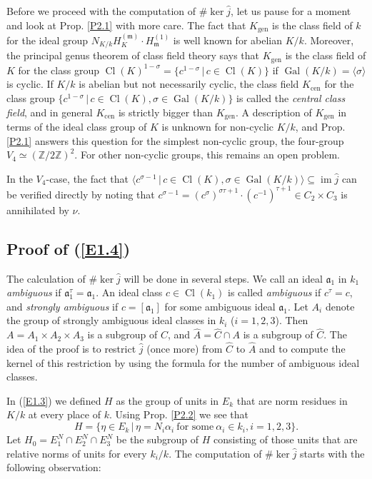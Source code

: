 \documentclass{amsart}
\newcommand{\Z}{\mathbb Z}
\newcommand{\fa}{{\mathfrak a}}
\newcommand{\fm}{{\mathfrak m}}
\newcommand{\hj}{\widehat{j}}
\newcommand{\hA}{\widehat{A}}
\newcommand{\hC}{\widehat{C}}
\newcommand{\la}{\langle}
\newcommand{\ra}{\rangle}
\newcommand{\sth}{\,|\,}
\newcommand{\Gal}{\operatorname{Gal}}
\newcommand{\Cl}{\operatorname{Cl}}
\newcommand{\im}{\operatorname{im}}
\newcommand{\gen}{{\operatorname{gen}}}
\newcommand{\cen}{{\operatorname{cen}}}
\begin{document}
Before we proceed with the computation of $\# \ker \hj$,
let us pause for a moment and look at Prop. \ref{P2.1} with
more care. The fact that $K_\gen$ is the class field of $k$
for the ideal group $N_{K/k} H_K^{(\fm)} \cdot H_{\fm}^{(1)}$
is well known for abelian $K/k$. Moreover, the principal
genus theorem of class field theory says that $K_\gen$ is
the class field of $K$ for the class group $\Cl(K)^{1-\sigma} =
\{c^{1-\sigma} \sth c \in \Cl(K)\}$ if $\Gal(K/k) = \la \sigma \ra$
is cyclic. If $K/k$ is abelian but not necessarily cyclic, the
class field $K_\cen$ for the class group $\{c^{1-\sigma} \sth
c \in \Cl(K), \sigma \in \Gal(K/k)\}$ is called the {\em central
class field}, and in general $K_\cen$ is strictly bigger than
$K_\gen$. A description of $K_\gen$ in terms of the ideal class
group of $K$ is unknown for non-cyclic $K/k$, and Prop. \ref{P2.1}
answers this question for the simplest non-cyclic group, the
four-group $V_4 \simeq (\Z/2\Z)^2$. For other non-cyclic groups,
this remains an open problem.

In the $V_4$-case, the fact that $\la c^{\sigma-1} \sth c \in \Cl(K),
\sigma \in \Gal(K/k) \ra \subseteq \im \hj$ can be verified
directly by noting that $c^{\sigma-1} = (c^\sigma)^{\sigma\tau+1}
\cdot (c^{-1})^{\tau+1} \in C_2 \times C_3$ is annihilated by $\nu$.

\subsection*{Proof of (\ref{E1.4})}

The calculation of $\# \ker \hj$ will be done in several steps.
We call an ideal $\fa_1$ in $k_1$ {\em ambiguous} if
$\fa_1^\tau = \fa_1$. An ideal class $c \in \Cl(k_1)$ is called
{\em ambiguous} if $c^\tau = c$, and {\em strongly ambiguous}
if $c = [\fa_1]$ for some ambiguous ideal $\fa_1$.  Let $A_i$
denote the group of strongly ambiguous ideal classes in $k_i$
($i = 1, 2, 3$). Then $A = A_1 \times A_2 \times A_3$ is a
subgroup of $C$, and $\hA = \hC \cap A$ is a subgroup of $\hC$.
The idea of the proof is to restrict $\hj$ (once more) from
$\hC$ to $\hA$ and to compute the kernel of this restriction
by using the formula for the number of ambiguous ideal classes.

In (\ref{E1.3}) we defined $H$ as the group of units in $E_k$
that are norm residues in $K/k$ at every place of $k$. Using
Prop. \ref{P2.2} we see that
$$ H = \{\eta \in E_k \sth \eta = N_i \alpha_i \ \text{for some}\
   \alpha_i \in k_i, i = 1, 2, 3\}. $$
Let $H_0 = E_1^N \cap E_2^N \cap E_3^N$ be the subgroup of $H$
consisting of those units that are relative norms of units for
every $k_i/k$. The computation of $\# \ker \hj$ starts with
the following observation:
\end{document}
